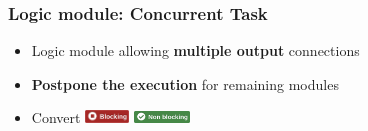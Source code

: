 \begin{frame}
    \frametitle{Logic module: Concurrent Task}
    \begin{itemize}
        \item Logic module allowing \textbf{multiple output} connections
        \item \textbf{Postpone the execution} for remaining modules
        \item Convert \includegraphics[valign=b,width=44px]{pictures/blocking-workflow.png}  \includegraphics[valign=b,width=56px]{pictures/non-blocking-workflow.png}
    \end{itemize}
    \begin{center}
    \end{center}
\end{frame}

